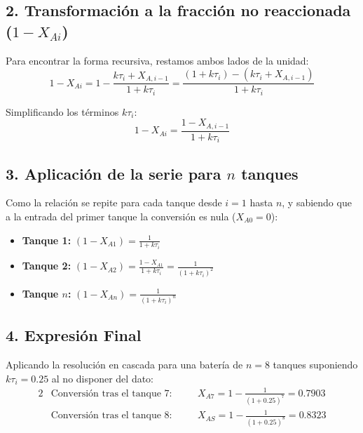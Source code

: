 \subsection*{2. Transformación a la fracción no reaccionada ($1 - X_{Ai}$)}

Para encontrar la forma recursiva, restamos ambos lados de la unidad:
\begin{equation}
    1 - X_{Ai} = 1 - \frac{k \tau_i + X_{A,i-1}}{1 + k \tau_i} = \frac{(1 + k \tau_i) - (k \tau_i + X_{A,i-1})}{1 + k \tau_i}
\end{equation}

Simplificando los términos $k \tau_i$:
\begin{equation}
    1 - X_{Ai} = \frac{1 - X_{A,i-1}}{1 + k \tau_i}
\end{equation}

\subsection*{3. Aplicación de la serie para $n$ tanques}

\noindent Como la relación se repite para cada tanque desde $i=1$ hasta $n$, y sabiendo que a la entrada del primer tanque la conversión es nula ($X_{A0} = 0$):

\begin{itemize}
    \item \textbf{Tanque 1:} $(1 - X_{A1}) = \frac{1}{1 + k \tau_i}$
    \item \textbf{Tanque 2:} $(1 - X_{A2}) = \frac{1 - X_{A1}}{1 + k \tau_i} = \frac{1}{(1 + k \tau_i)^2}$
    \item \textbf{Tanque $n$:} $(1 - X_{An}) = \frac{1}{(1 + k \tau_i)^n}$
\end{itemize}

\subsection*{4. Expresión Final}

\noindent Aplicando la resolución en cascada para una batería de $n=8$ tanques suponiendo $k\tau_i = 0.25$ al no disponer del dato:
\begin{alignat*}{2}
     & \text{Conversión tras el tanque 7:} \quad &  & X_{A7} = 1 - \frac{1}{(1 + 0.25)^7} = \mathbf{0.7903} \\
     & \text{Conversión tras el tanque 8:}       &  & X_{AS} = 1 - \frac{1}{(1 + 0.25)^8} = \mathbf{0.8323}
\end{alignat*}

